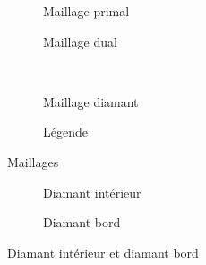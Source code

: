 \begin{figure}[H]
\centering
\begin{subfigure}[t]{.5\textwidth}
    \centering
    
    \caption{Maillage primal}
\end{subfigure}%
\begin{subfigure}[t]{.5\textwidth}
    \centering
    
    \caption{Maillage dual}
\end{subfigure} \\
\begin{subfigure}[c]{0.5\textwidth}
    \centering
    
    \caption{Maillage diamant}
\end{subfigure}%
\begin{subfigure}[c]{0.5\textwidth}
    \centering
    \caption{Légende}
\end{subfigure}
\caption{Maillages \ddfv}
\end{figure}

\begin{figure}[H]
\centering
\begin{subfigure}[t]{.5\textwidth}
    \centering
    
    \caption{Diamant intérieur}
\end{subfigure}%
\begin{subfigure}[t]{.5\textwidth}
    \centering
    
    \caption{Diamant bord}
\end{subfigure}
\caption{Diamant intérieur et diamant bord}
\end{figure}